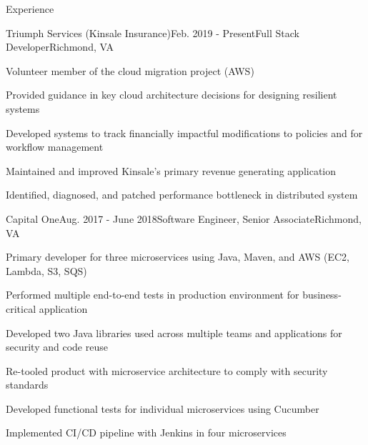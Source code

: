 \documentclass{resume} %
\begin{document}

\begin{rSection}{Experience}

\begin{rSubsection}{Triumph Services (Kinsale Insurance)}{Feb. 2019 - Present}{Full Stack Developer}{Richmond, VA}
	
	\setlength{\itemindent}{.0in}\item 
	Volunteer member of the cloud migration project (AWS)
	\setlength{\itemindent}{.0in}\item 
	Provided guidance in key cloud architecture decisions for designing resilient systems
	\setlength{\itemindent}{.0in}\item 
	Developed systems to track financially impactful modifications to policies and for workflow management
	\setlength{\itemindent}{.0in}\item
	Maintained and improved Kinsale's primary revenue generating application
	\setlength{\itemindent}{.0in}\item
	Identified, diagnosed, and patched performance bottleneck in distributed system
	
\end{rSubsection}


\begin{rSubsection}{Capital One}{Aug. 2017 - June 2018}{Software Engineer, Senior Associate}{Richmond, VA}
 
\setlength{\itemindent}{.0in}\item 
Primary developer for three microservices using Java, Maven, and AWS (EC2, Lambda, S3, SQS)
\setlength{\itemindent}{.0in}\item 
Performed multiple end-to-end tests in production environment for business-critical application
\setlength{\itemindent}{.0in}\item 
Developed two Java libraries used across multiple teams and applications for security and code reuse
\setlength{\itemindent}{.0in}\item 
Re-tooled product with microservice architecture to comply with security standards
\setlength{\itemindent}{.0in}\item
Developed functional tests for individual microservices using Cucumber
\setlength{\itemindent}{.0in}\item
Implemented CI/CD pipeline with Jenkins in four microservices


\end{rSubsection}
\end{rSection}
\end{document}

